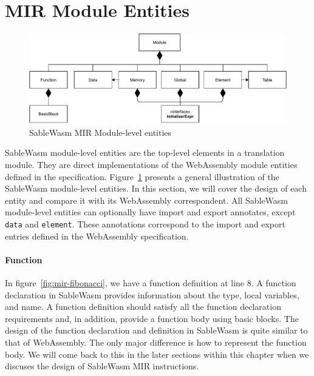 \section{MIR Module Entities}

\begin{figure}
  \centering
  \includegraphics[width=\textwidth]{Images/4.MIR/module.pdf}
  \caption{SableWasm MIR Module-level entities}
  \label{fig:sablewasm-mir-module}
\end{figure}

SableWasm module-level entities are the top-level elements in a translation
module. They are direct implementations of the WebAssembly module entities
defined in the specification. Figure~\ref{fig:sablewasm-mir-module} presents a
general illustration of the SableWasm module-level entities. In this section,
we will cover the design of each entity and compare it with its WebAssembly
correspondent. All SableWasm module-level entities can optionally have import
and export annotates, except \texttt{data} and \texttt{element}. These
annotations correspond to the import and export entries defined in the
WebAssembly specification.

\paragraph{Function}
In figure~\ref{fig:mir-fibonacci}, we have a function definition at line 8. A
function declaration in SableWasm provides information about the type, local
variables, and name. A function definition should satisfy all the function
declaration requirements and, in addition, provide a function body using basic
blocks. The design of the function declaration and definition in SableWasm is
quite similar to that of WebAssembly. The only major difference is how to
represent the function body. We will come back to this in the later sections
within this chapter when we discuses the design of SableWasm MIR instructions.

